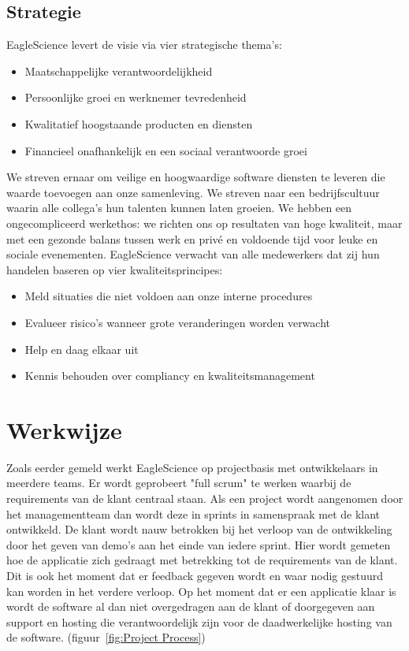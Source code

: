 \subsection{Strategie}\label{subsec:strategie}
EagleScience levert de visie via vier strategische thema's:
\begin{itemize}
    \item Maatschappelijke verantwoordelijkheid
    \item Persoonlijke groei en werknemer tevredenheid
    \item Kwalitatief hoogstaande producten en diensten
    \item Financieel onafhankelijk en een sociaal verantwoorde groei
\end{itemize}
We streven ernaar om veilige en hoogwaardige software diensten te leveren die waarde toevoegen aan onze samenleving. We streven naar een bedrijfscultuur waarin alle collega's hun talenten kunnen laten groeien. We hebben een ongecompliceerd werkethos: we richten ons op resultaten van hoge kwaliteit, maar met een gezonde balans tussen werk en privé en voldoende tijd voor leuke en sociale evenementen. EagleScience verwacht van alle medewerkers dat zij hun handelen baseren op vier kwaliteitsprincipes:
\begin{itemize}
    \item Meld situaties die niet voldoen aan onze interne procedures
    \item Evalueer risico's wanneer grote veranderingen worden verwacht
    \item Help en daag elkaar uit
    \item Kennis behouden over compliancy en kwaliteitsmanagement
\end{itemize}

\section{Werkwijze}\label{sec:werkwijze}
Zoals eerder gemeld werkt EagleScience op projectbasis met ontwikkelaars in meerdere teams. Er wordt geprobeert "full scrum" te werken waarbij de requirements van de klant centraal staan. Als een project wordt aangenomen door het managementteam dan wordt deze in sprints in samenspraak met de klant ontwikkeld. De klant wordt nauw betrokken bij het verloop van de ontwikkeling door het geven van demo's aan het einde van iedere sprint. Hier wordt gemeten hoe de applicatie zich gedraagt met betrekking tot de requirements van de klant. Dit is ook het moment dat er feedback gegeven wordt en waar nodig gestuurd kan worden in het verdere verloop. Op het moment dat er een applicatie klaar is wordt de software al dan niet overgedragen aan de klant of doorgegeven aan support en hosting die verantwoordelijk zijn voor de daadwerkelijke hosting van de software. (figuur~\ref{fig:Project Process})

